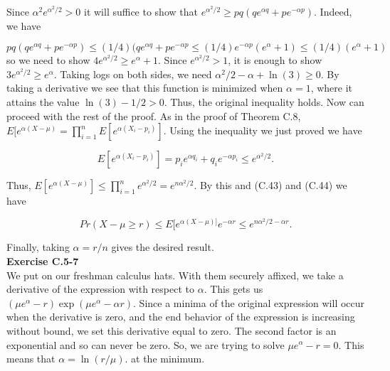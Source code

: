 \documentclass{article}
\begin{document}
Since $ \alpha^2e^{\alpha^2/2} > 0$ it will suffice to show that $e^{\alpha^2/2} \geq pq(qe^{\alpha q} + pe^{-\alpha p})$.  Indeed, we have

\[pq(qe^{\alpha q} + pe^{-\alpha p}) \leq (1/4)(qe^{\alpha q} + pe^{-\alpha p} \leq (1/4)e^{-\alpha p}(e^\alpha + 1) \leq (1/4)(e^\alpha + 1)\]
so we need to show $4e^{\alpha^2/2} \geq e^{\alpha} + 1$.  Since $e^{\alpha^2/2} > 1$, it is enough to show $3e^{\alpha^2/2} \geq e^{\alpha}$.  Taking logs on both sides, we need $\alpha^2/2 - \alpha + \ln(3) \geq 0$.  By taking a derivative we see that this function is minimized when $\alpha = 1$, where it attains the value $\ln(3)-1/2 > 0$.  Thus, the original inequality holds.  Now can proceed with the rest of the proof.  As in the proof of Theorem C.8, $E[e^{\alpha(X-\mu)} = \prod_{i=1}^n E[e^{\alpha(X_i-p_i)}]$.  Using the inequality we just proved we have 

\[ E[e^{\alpha(X_i-p_i)}] = p_ie^{\alpha q_i} + q_ie^{-\alpha p_i} \leq e^{\alpha^2/2}.\]

Thus, $E[e^{\alpha(X-\mu)}] \leq \prod_{i=1}^n e^{\alpha^2/2} = e^{n\alpha^2/2}$.  By this and (C.43) and (C.44) we have 

\[Pr(X-\mu \geq r) \leq E[e^{\alpha(X-\mu)]}e^{-\alpha r} \leq e^{n \alpha^2/2 - \alpha r}.\]

Finally, taking $\alpha = r/n$ gives the desired result. \\

\noindent\textbf{Exercise C.5-7}\\

We put on our freshman calculus hats. With them securely affixed, we take a derivative of the expression with respect to $\alpha$. This gets us $(\mu e^{\alpha} - r)\exp(\mu e^{\alpha}- \alpha r)$. Since a minima of the original expression will occur when the derivative is zero, and the end behavior of the expression is increasing without bound, we set this derivative equal to zero. The second factor is an exponential and so can never be zero. So, we are trying to solve $\mu e^{\alpha} - r = 0$. This means that $\alpha = \ln(r/\mu)$. at the minimum.\\
\end{document}
